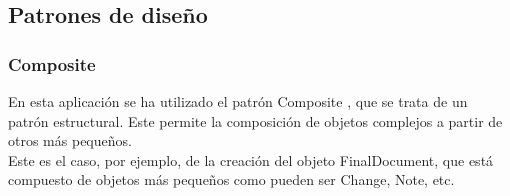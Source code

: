 \subsection{Patrones de diseño}

\subsubsection{Composite}

En esta aplicación se ha utilizado el patrón Composite \cite{composite}, que se trata de un patrón estructural. Este permite la composición de objetos complejos a partir de otros más pequeños. 
\\

Este es el caso, por ejemplo, de la creación del objeto FinalDocument, que está compuesto de objetos más pequeños como pueden ser Change, Note, etc.